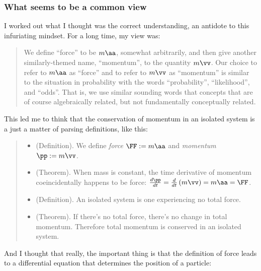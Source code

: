 \documentclass{article}
\begin{document}
\subsubsection*{What seems to be a common view}

I worked out what I thought was the correct understanding, an antidote to this infuriating mindset. For a long time, my view was:

\begin{quote}
   We define ``force'' to be $m \aa$, somewhat arbitrarily, and then give another similarly-themed name, ``momentum'', to the quantity $m \vv$. Our choice to refer to $m \aa$ as ``force'' and to refer to $m \vv$ as ``momentum'' is similar to the situation in probability with the words ``probability'', ``likelihood'', and ``odds''. That is, we use similar sounding words that concepts that are of course algebraically related, but not fundamentally conceptually related.
\end{quote}

This led me to think that the conservation of momentum in an isolated system is a just a matter of parsing definitions, like this:

\begin{quote}
    \begin{itemize}
        \item (Definition). We define \textit{force} $\FF := m \aa$ and \textit{momentum} $\pp := m \vv$.
        \item (Theorem). When mass is constant, the time derivative of momentum coeincidentally happens to be force: $\frac{d\pp}{dt} = \frac{d}{dt}\left(m\vv\right) = m\aa = \FF$.
        \item (Definition). An isolated system is one experiencing no total force.
        \item (Theorem). If there's no total force, there's no change in total momentum. Therefore total momentum is conserved in an isolated system.
    \end{itemize}
\end{quote}

And I thought that really, the important thing is that the definition of force leads to a differential equation that determines the position of a particle:
\end{document}
